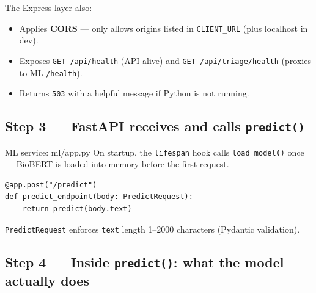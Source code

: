 \documentclass[11pt]{article}
\begin{document}
The Express layer also:
\begin{itemize}
  \item Applies \textbf{CORS} --- only allows origins listed in \texttt{CLIENT\_URL} (plus localhost
        in dev).
  \item Exposes \texttt{GET /api/health} (API alive) and \texttt{GET /api/triage/health} (proxies
        to ML \texttt{/health}).
  \item Returns \texttt{503} with a helpful message if Python is not running.
\end{itemize}

\subsection{Step 3 --- FastAPI receives and calls \texttt{predict()}}

\begin{filebox}{ML service: ml/app.py}
On startup, the \texttt{lifespan} hook calls \texttt{load\_model()} once --- BioBERT is loaded into
memory before the first request.

\begin{lstlisting}
@app.post("/predict")
def predict_endpoint(body: PredictRequest):
    return predict(body.text)
\end{lstlisting}

\texttt{PredictRequest} enforces \texttt{text} length 1--2000 characters (Pydantic validation).
\end{filebox}

\subsection{Step 4 --- Inside \texttt{predict()}: what the model actually does}
\end{document}
